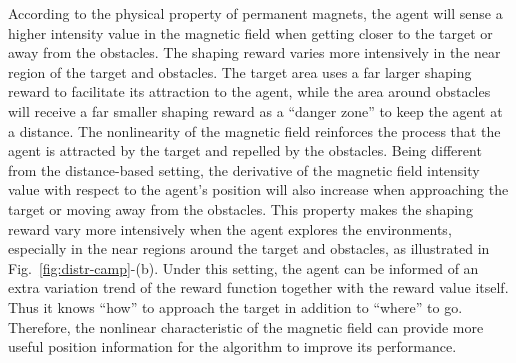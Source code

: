 \documentclass[journal]{IEEEtran}
\begin{document}
According to the physical property of permanent magnets, the agent will sense a higher intensity value in the magnetic field when getting closer to the target or away from the obstacles.
The shaping reward varies more intensively in the near region of the target and obstacles.
The target area uses a far larger shaping reward to facilitate its attraction to the agent, while the area around obstacles will receive a far smaller shaping reward as a ``danger zone'' to keep the agent at a distance.
The nonlinearity of the magnetic field reinforces the process that the agent is attracted by the target and repelled by the obstacles.
Being different from the distance-based setting, the derivative of the magnetic field intensity value with respect to the agent's position will also increase when approaching the target or moving away from the obstacles.
This property makes the shaping reward vary more intensively when the agent explores the environments, especially in the near regions around the target and obstacles, as illustrated in Fig.~\ref{fig:distr-camp}-(b).
Under this setting, the agent can be informed of an extra variation trend of the reward function together with the reward value itself. Thus it knows ``how'' to approach the target in addition to ``where'' to go.
Therefore, the nonlinear characteristic of the magnetic field can provide more useful position information for the algorithm to improve its performance.
\end{document}
